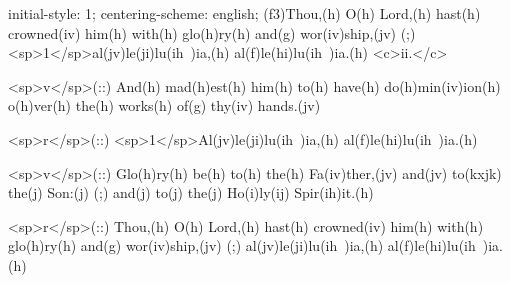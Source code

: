 initial-style: 1;
centering-scheme: english;
(f3)Thou,(h) O(h) Lord,(h) hast(h) crowned(iv) him(h) with(h) glo(h)ry(h) and(g) wor(iv)ship,(jv) (;) <sp>1</sp>al(jv)le(ji)lu(ih~)ia,(h) al(f)le(hi)lu(ih~)ia.(h) <c>ii.</c>

<sp>v</sp>(::) And(h) mad(h)est(h) him(h) to(h) have(h) do(h)min(iv)ion(h) o(h)ver(h) the(h) works(h) of(g) thy(iv) hands.(jv)

<sp>r</sp>(::) <sp>1</sp>Al(jv)le(ji)lu(ih~)ia,(h) al(f)le(hi)lu(ih~)ia.(h) 

<sp>v</sp>(::) Glo(h)ry(h) be(h) to(h) the(h) Fa(iv)ther,(jv) and(jv) to(kxjk) the(j) Son:(j) (;) and(j) to(j) the(j) Ho(i)ly(ij) Spir(ih)it.(h)

<sp>r</sp>(::) Thou,(h) O(h) Lord,(h) hast(h) crowned(iv) him(h) with(h) glo(h)ry(h) and(g) wor(iv)ship,(jv) (;) al(jv)le(ji)lu(ih~)ia,(h) al(f)le(hi)lu(ih~)ia.(h)